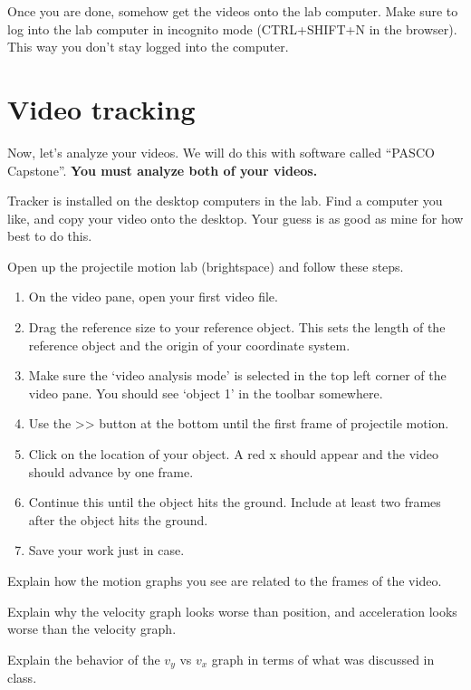 \documentclass{handout}
\begin{document}
Once you are done, somehow get the videos onto the lab computer. Make sure to  log into the lab computer in incognito mode (CTRL+SHIFT+N in the browser). This way you don't stay logged into the computer.

\section*{Video tracking}
Now, let’s analyze your videos. We will do this with software called ``PASCO Capstone''.
\textbf{You must analyze both of your videos.}

Tracker is installed on the desktop computers in the lab. Find a computer you
like, and copy your video onto the desktop. Your guess is as good as mine for
how best to do this.

Open up the projectile motion lab (brightspace) and follow these steps. 
\begin{enumerate}
    \item On the video pane, open your first video file. 
    \item Drag the reference size to your reference object. This sets the length of the reference object and the origin of your coordinate system.
    \item Make sure the `video analysis mode' is selected in the top left corner of the video pane. You should see `object 1' in the toolbar somewhere.
    \item Use the >> button at the bottom until the first frame of projectile motion.
    \item Click on the location of your object. A red x should appear and the video should advance by one frame.
    \item Continue this until the object hits the ground. Include at least two frames after the object hits the ground.
    \item Save your work just in case.
\end{enumerate}

\begin{questions}
    \question Explain how the motion graphs you see are related to the frames of the video.
    \answerspace{2in}

    \question Explain why the velocity graph looks worse than position, and acceleration looks worse than the velocity graph. 

    \answerspace{2in}

    \question Explain the behavior of the $v_y$ vs $v_x$ graph in terms of what was discussed in class.
    \answerspace{2in}
\end{questions}
\end{document}

